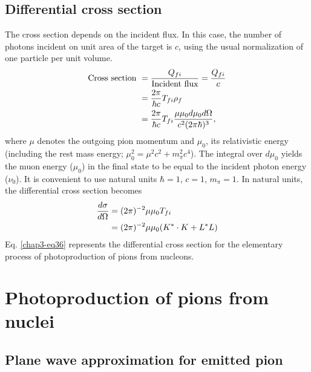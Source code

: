 \subsection{Differential cross section}\label{chap3-sec4.2}

The cross section depends on the incident flux. In this case, the number of photons incident on unit area of the target is $c$, using the usual normalization of one particle per unit volume.
\begin{align}
  \text{Cross section}~ & = \frac{Q_{fi}}{\text{Incident flux}} = \frac{Q_{fi}}{c}\notag \\
  & = \frac{2 \pi}{\hbar c} T_{fi} \rho_ f \notag \\
  & = \frac{2\pi}{\hbar c} T_{fi} \frac{\mu \mu_0 d \mu_0 d \Omega}{c^2 (2 \pi \hbar)^3},\label{chap3-eq35}
\end{align}
where $\mu$ denotes the outgoing pion momentum and $\mu_0$, its relativistic energy (including the rest mass energy; $\mu_0^2 = \mu^2 c^2 + m_\pi^2 c^4$). The integral over $d\mu_0$ yields the muon energy ($\mu_0$) in the final state to be equal to the incident photon energy ($\nu_0$). It is convenient to use natural units $\hbar =1$, $c=1$, $m_\pi =1$. In natural units, the differential cross section becomes
\begin{align}
  \frac{d \sigma}{d \Omega} & = (2 \pi)^{-2} \mu \mu_0 T_{fi}\notag \\
  & = (2 \pi)^{-2} \mu \mu_0 ({\boldmath  K^\ast \cdot K} + L^\ast L) \label{chap3-eq36}
\end{align}
Eq. \eqref{chap3-eq36} represents the differential cross section for the elementary process of photoproduction of pions from nucleons.

\section{Photoproduction of pions from nuclei}\label{chap3-sec5}

\subsection{Plane wave approximation for emitted pion}\label{chap3-sec5.1}

